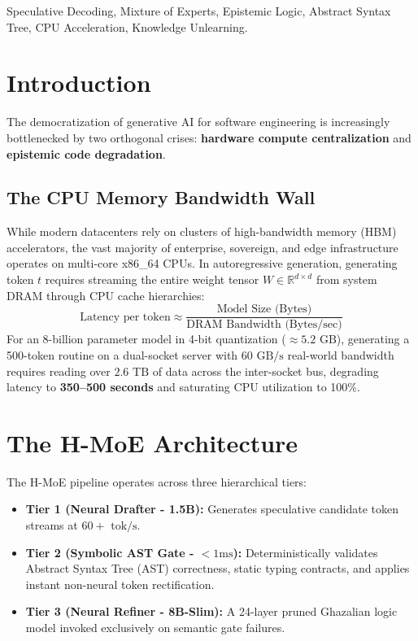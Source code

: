 \documentclass[conference]{IEEEtran}
\begin{document}
\begin{IEEEkeywords}
Speculative Decoding, Mixture of Experts, Epistemic Logic, Abstract Syntax Tree, CPU Acceleration, Knowledge Unlearning.
\end{IEEEkeywords}

\section{Introduction}
The democratization of generative AI for software engineering is increasingly bottlenecked by two orthogonal crises: \textbf{hardware compute centralization} and \textbf{epistemic code degradation}.

\subsection{The CPU Memory Bandwidth Wall}
While modern datacenters rely on clusters of high-bandwidth memory (HBM) accelerators, the vast majority of enterprise, sovereign, and edge infrastructure operates on multi-core x86\_64 CPUs. In autoregressive generation, generating token $t$ requires streaming the entire weight tensor $W \in \mathbb{R}^{d \times d}$ from system DRAM through CPU cache hierarchies:
\begin{equation}
\text{Latency per token} \approx \frac{\text{Model Size (Bytes)}}{\text{DRAM Bandwidth (Bytes/sec)}}
\end{equation}
For an 8-billion parameter model in 4-bit quantization ($\approx 5.2\text{ GB}$), generating a 500-token routine on a dual-socket server with $60\text{ GB/s}$ real-world bandwidth requires reading over $2.6\text{ TB}$ of data across the inter-socket bus, degrading latency to \textbf{350--500 seconds} and saturating CPU utilization to 100\%.

\section{The H-MoE Architecture}
The H-MoE pipeline operates across three hierarchical tiers:
\begin{itemize}
    \item \textbf{Tier 1 (Neural Drafter - 1.5B):} Generates speculative candidate token streams at $60+\text{ tok/s}$.
    \item \textbf{Tier 2 (Symbolic AST Gate - $<1\text{ms}$):} Deterministically validates Abstract Syntax Tree (AST) correctness, static typing contracts, and applies instant non-neural token rectification.
    \item \textbf{Tier 3 (Neural Refiner - 8B-Slim):} A 24-layer pruned Ghazalian logic model invoked exclusively on semantic gate failures.
\end{itemize}
\end{document}
